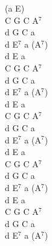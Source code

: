 \documentclass[a5paper, 10pt]{book}
\begin{document}
\begin{minipage}[t]{0.2\textwidth}
  (a E)\\
  C G C A$^7$\\
  d G C a\\
  d E$^7$ a (A$^7$)\\

  d E a\\
  C G C A$^7$\\
  d G C a\\
  d E$^7$ a (A$^7$)\\

  d E a\\
  C G C A$^7$\\
  d G C a\\
  d E$^7$ a (A$^7$)\\

  d E a\\
  C G C A$^7$\\
  d G C a\\
  d E$^7$ a (A$^7$)\\

  d E a\\
  C G C A$^7$\\
  d G C a\\
  d E$^7$ a (A$^7$)\\
\end{minipage}

\newpage
\end{document}
